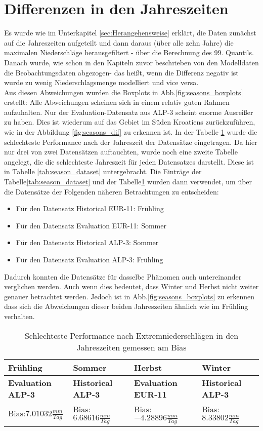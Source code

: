 \section{Differenzen in den Jahreszeiten}
Es wurde wie im Unterkapitel \ref{sec:Herangehensweise} erklärt, die Daten zunächst auf die Jahreszeiten aufgeteilt und dann daraus (über alle zehn Jahre) die maximalen Niederschläge herausgefiltert - über die Berechnung des 99. Quantils. Danach wurde, wie schon in den Kapiteln zuvor beschrieben von den Modelldaten die Beobachtungsdaten abgezogen- das heißt, wenn die Differenz negativ ist wurde zu wenig Niederschlagsmenge modelliert und vice versa.\\
Aus diesen Abweichungen wurden die Boxplots in Abb.\ref{fig:seasons_boxplots} erstellt: Alle Abweichungen scheinen sich in einem relativ guten Rahmen aufzuhalten. Nur der Evaluation-Datensatz aus ALP-3 scheint enorme Ausreißer zu haben. Dies ist wiederum auf das Gebiet im Süden Kroatiens zurückzuführen, wie in der Abbildung \ref{fig:seasons_dif} zu erkennen ist. In der Tabelle \ref{tab:season_bias} wurde die schlechteste Performance nach der Jahreszeit der Datensätze eingetragen. Da hier nur drei von zwei Datensätzen auftauchten, wurde noch eine zweite Tabelle angelegt, die die schlechteste Jahreszeit für jeden Datensatzes darstellt. Diese ist in Tabelle \ref{tab:season_dataset} untergebracht. Die Einträge der Tabelle\ref{tab:season_dataset} und der Tabelle\ref{tab:season_bias} wurden dann verwendet, um über die Datensätze der Folgenden näheren Betrachtungen zu entscheiden:
\begin{itemize}
	\item Für den Datensatz Historical EUR-11: Frühling
	\item Für den Datensatz Evaluation EUR-11: Sommer
	\item Für den Datensatz Historical ALP-3: Sommer
	\item Für den Datensatz Evaluation ALP-3: Frühling
\end{itemize}
Dadurch konnten die Datensätze für dasselbe Phänomen auch untereinander verglichen werden. Auch wenn dies bedeutet, dass Winter und Herbst nicht weiter genauer betrachtet werden. Jedoch ist in Abb.\ref {fig:seasons_boxplots} zu erkennen dass sich die Abweichungen dieser beiden Jahreszeiten ähnlich wie im Frühling verhalten.
\begin{table}[h]
	\begin{tabularx}{\textwidth}{|X|X|X|X|}
		\hline
		\textbf{Frühling} & \textbf{Sommer}& \textbf{Herbst} & \textbf{Winter}\\
		\hline
		\textbf{Evaluation ALP-3}  & \textbf{Historical ALP-3}  & \textbf{Evaluation EUR-11} & \textbf{Historical ALP-3} \\
		Bias:$7.01032\frac{mm}{Tag}$& Bias:$6.68616\frac{mm}{Tag}$ & Bias: $-4.28896\frac{mm}{Tag}$ & Bias:$8.33802\frac{mm}{Tag}$\\
		\hline
	\end{tabularx}
	\caption{Schlechteste Performance nach Extremniederschlägen in den Jahreszeiten gemessen am Bias}
	\label{tab:season_bias}
\end{table}
